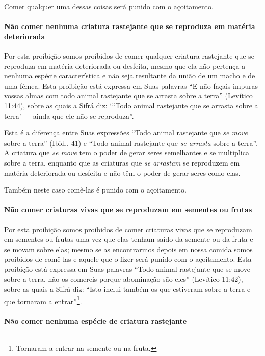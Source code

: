 Comer qualquer uma dessas coisas será punido com o açoitamento.

\paragraph{Não comer nenhuma criatura rastejante que se reproduza em matéria
deteriorada}

Por esta proibição somos proibidos de comer qualquer criatura
rastejante que se reproduza em matéria deteriorada ou desfeita, mesmo
que ela não pertença a nenhuma espécie característica e não seja
resultante da união de um macho e de uma fêmea. Esta proibição está
expressa em Suas palavras
``E não façais impuras vossas almas com todo animal rastejante que se
arrasta sobre a terra'' (Levítico 11:44), sobre as quais a Sifrá diz:
```Todo animal rastejante que se arrasta sobre a terra' --- ainda que
ele não se reproduza''.

Esta é a diferença entre Suas expressões ``Todo animal rastejante que
\emph{se move} sobre a terra'' (Ibid., 41) e ``Todo animal rastejante
que \emph{se arrasta} sobre a terra''. A criatura que \emph{se move} tem
o poder de gerar seres semelhantes e se multiplica sobre a terra,
enquanto que as criaturas que \emph{se arrastam} se reproduzem em
matéria deteriorada ou desfeita e não têm o poder de gerar seres como
elas.

Também neste caso comê-las é punido com o açoitamento.

\paragraph{Não comer criaturas vivas que se reproduzam em sementes ou frutas}

Por esta proibição somos proibidos de comer criaturas vivas que se
reproduzam em sementes ou frutas uma vez que elas tenham saído da
semente ou da fruta e se movam sobre elas; mesmo se as encontrarmos
depois em nossa comida somos proibidos de comê-las e aquele que o fizer
será punido com o açoitamento. Esta proibição está expressa em Suas
palavras ``Todo animal rastejante que se move sobre a terra, não os
comereis porque abominação são eles'' (Levítico 11:42), sobre as quais a
Sifrá diz: ``Isto inclui também os que estiveram sobre a terra e que
tornaram a entrar''\footnote{Tornaram a entrar na semente ou na fruta.}.

\paragraph{Não comer nenhuma espécie de criatura rastejante}

